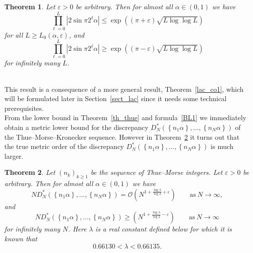 \documentclass[12pt]{amsart}
\newtheorem{theorem}{Theorem}
\newcommand {\ve} {\varepsilon}
\begin{document}
\begin{theorem} \label{th_theorem2}
Let $ \ve > 0$ be arbitrary. Then for almost all $\alpha \in \left(0,1\right)$ we have
\begin{equation} \label{FO2}
\prod^{L}_{\ell=0} \left|2 \sin \pi 2^{\ell} \alpha\right| \leq \exp\left(\left(\pi+\ve\right)\sqrt{L \log \log L}\right)
\end{equation}
for all $L \geq L_0\left(\alpha, \ve\right)$, and
\begin{equation} \label{FO3}
\prod^{L}_{\ell=0} \left|2 \sin \pi 2^{\ell} \alpha \right| \geq \exp\left(\left(\pi- \ve\right)\sqrt{L \log \log L}\right)
\end{equation}
for infinitely many $L$.
\end{theorem}
~\\ 

This result is a consequence of a more general result, Theorem~\ref{lac_co1}, which will be formulated later in Section~\ref{sect_lac} since it needs some technical prerequisites.\\

From the lower bound in Theorem~\ref{th_thue} and formula~\eqref{BL1} we immediately obtain a metric lower bound for the discrepancy $D_{N}^{*} \left(\left\{n_{1} \alpha\right\}, \ldots, \left\{n_{N} \alpha\right\}\right)$ of the Thue--Morse--Kronecker sequence. However in Theorem~\ref{th_thue2} it turns out that the true metric order of the discrepancy $D_{N}^{*} \left(\left\{n_{1} \alpha\right\}, \ldots, \left\{n_{N} \alpha\right\}\right)$ is much larger.\\

\begin{theorem} \label{th_thue2}
Let $\left(n_{k}\right)_{k \geq 1}$ be the sequence of Thue--Morse integers. Let $\ve >0$ be arbitrary. Then for almost all $\alpha \in \left(0,1\right)$ we have
\begin{equation} \label{F3}
N D^{*}_{N} \left(\left\{n_{1} \alpha\right\}, \ldots, \left\{n_{N} \alpha\right\}\right)= \mathcal{O} \left(N^{1+\frac{\log \lambda}{\log 2} + \ve}\right) \qquad \mbox{as}~ N \rightarrow \infty,
\end{equation}
and
\begin{equation} \label{F4}
N D^{*}_{N} \left(\left\{n_{1} \alpha\right\}, \ldots, \left\{n_{N} \alpha\right\}\right) \geq \left(N^{1+\frac{\log \lambda}{\log 2} - \ve}\right) \qquad \mbox{as}~ N \rightarrow \infty
\end{equation}
for infinitely many $N$. Here $\lambda$ is a real constant defined below for which it is known that 
\begin{equation} \label{*}
0.66130 < \lambda < 0.66135.
\end{equation}
\end{theorem}
~\\
\end{document}
